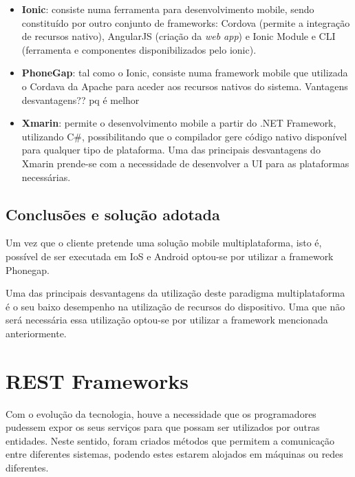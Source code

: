 \begin{itemize}
	\item \textbf{Ionic}: consiste numa ferramenta para desenvolvimento mobile, sendo constituído por outro conjunto de frameworks: Cordova (permite a integração de recursos nativo), AngularJS (criação da \textit{web app}) e Ionic Module e CLI (ferramenta e componentes disponibilizados pelo ionic)\cite{Ionic2016}. 
	
	\item \textbf{PhoneGap}: tal como o Ionic, consiste numa framework mobile que utilizada o Cordava da Apache para aceder aos recursos nativos do sistema. Vantagens desvantagens?? pq é melhor 
	
	\item \textbf{Xmarin}: permite o desenvolvimento mobile a partir do .NET Framework, utilizando C\#, possibilitando que o compilador gere código nativo disponível para qualquer tipo de plataforma. Uma das principais desvantagens do Xmarin prende-se com a necessidade de desenvolver a \ac{UI} para as plataformas necessárias. 
\end{itemize}
 


\subsection{Conclusões e solução adotada}



Um vez que o cliente pretende uma solução mobile multiplataforma, isto é, possível de ser executada em IoS e Android optou-se por utilizar a framework Phonegap. 



Uma das principais desvantagens da utilização deste paradigma multiplataforma é o seu baixo desempenho na utilização de recursos do dispositivo. Uma que não será necessária essa utilização optou-se por utilizar a framework mencionada anteriormente. 



\newpage
\section{REST Frameworks}


Com o evolução da tecnologia, houve a necessidade que os programadores pudessem expor os seus serviços para que possam ser utilizados por outras entidades. Neste sentido, foram criados métodos que permitem a comunicação  entre diferentes sistemas, podendo estes estarem alojados em máquinas ou redes diferentes.   

